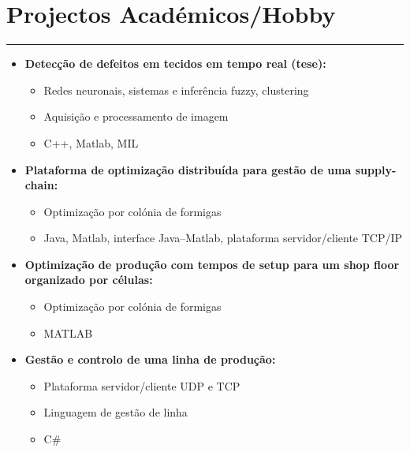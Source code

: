 \documentclass[a4paper,portuguese]{article}
\newcommand{\topic}[1]{
\section*{#1} \vspace{-6mm}
\rule{\columnwidth}{.25mm}
}
\begin{document}
\topic{Projectos Académicos/Hobby}
\begin{itemize}
    \setlength{\itemsep}{-1mm}
    \item[] {\bf Detecção de defeitos em tecidos em tempo real (tese):}\\ \vspace{-7mm}
    \begin{itemize}
        \setlength{\itemsep}{-1mm}
        \item[] Redes neuronais, sistemas e inferência fuzzy, clustering
        \item[] Aquisição e processamento de imagem
        \item[] C++, Matlab, MIL
    \end{itemize}

    \item[] {\bf  Plataforma de optimização distribuída para gestão de uma supply-chain:}\\ \vspace{-7mm}
    \begin{itemize}
        \setlength{\itemsep}{-1mm}
        \item Optimização por colónia de formigas
        \item Java, Matlab, interface Java--Matlab, plataforma servidor/cliente TCP/IP
    \end{itemize}

    \item[] {\bf  Optimização de produção com tempos de setup para um shop floor organizado por células:}\\ \vspace{-7mm}
    \begin{itemize}
    \setlength{\itemsep}{-1mm}
        \item Optimização por colónia de formigas
        \item MATLAB
    \end{itemize}

    \item[] {\bf  Gestão e controlo de uma linha de produção:}\\ \vspace{-7mm}
    \begin{itemize}
    \setlength{\itemsep}{-1mm}
        \item Plataforma servidor/cliente UDP e TCP
        \item Linguagem de gestão de linha
        \item C\#
    \end{itemize}


\end{itemize}
\end{document}
